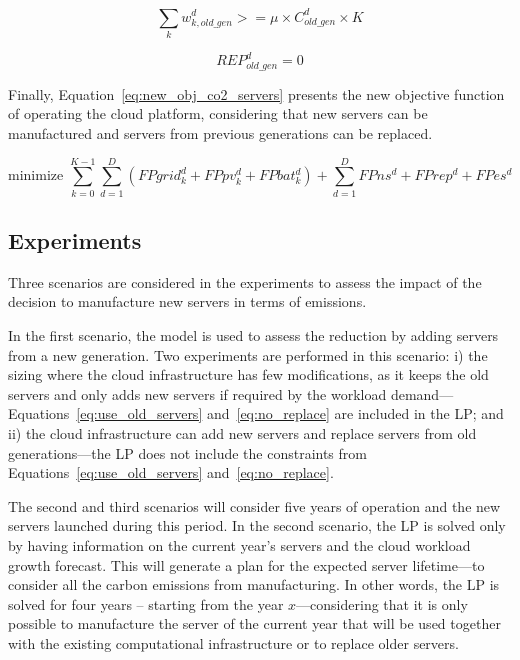 \begin{equation}\label{eq:use_old_servers}     
   \sum_k w^d_{k,old\_gen} >= \mu \times C^d_{old\_gen} \times K 
 \end{equation}

\begin{equation} \label{eq:no_replace}
 REP_{old\_gen}^d  = 0 
\end{equation}


Finally, Equation~\eqref{eq:new_obj_co2_servers} presents the new objective function of operating the cloud platform, considering that new servers can be manufactured and servers from previous generations can be replaced.

\begin{equation} \label{eq:new_obj_co2_servers}
\text{minimize }\sum_{k=0}^{K-1} \sum_{d=1}^D (FPgrid^d_k +  FPpv^d_k + FPbat^d_k) + \sum_{d=1}^D   FPns^d + FPrep^d + FPes^d 
\end{equation}



\subsection{Experiments}
\label{sec:experiments_ext_ccgrid}
Three scenarios are considered in the experiments to assess the impact of the decision to manufacture new servers in terms of  emissions.

In the first scenario, the model is used to assess the  reduction by adding servers from a new generation. Two experiments are performed in this scenario: i) the sizing where the cloud infrastructure has few modifications, as it keeps the old servers and only adds new servers if required by the workload demand---Equations~\eqref{eq:use_old_servers} and~\eqref{eq:no_replace} are included in the LP; and ii) the cloud infrastructure can add new servers and replace servers from old generations---the LP does not include the constraints from Equations~\eqref{eq:use_old_servers} and~\eqref{eq:no_replace}.

The second and third scenarios will consider five years of operation and the new servers launched during this period. In the second scenario, the LP is solved only by having information on the current year's servers and the cloud workload growth forecast. This will generate a plan for the expected server lifetime---to consider all the carbon emissions from manufacturing. In other words, the LP is solved for four years -- starting from the year $x$---considering that it is only possible to manufacture the server of the current year that will be used together with the existing computational infrastructure or to replace older servers.

